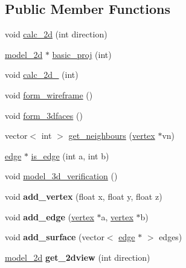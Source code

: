 \subsection*{Public Member Functions}
\begin{DoxyCompactItemize}
\item 
void \hyperlink{classmodel__3d_a34719029f1c5a2bc5a609dffc741a2e4}{calc\+\_\+2d} (int direction)
\item 
\hyperlink{classmodel__2d}{model\+\_\+2d} $\ast$ \hyperlink{classmodel__3d_aa08ac7e10a9531d7b7f8fb70b65cce82}{basic\+\_\+proj} (int)
\item 
void \hyperlink{classmodel__3d_acb0cca59029c43fe4b87b5e1b3df48f0}{calc\+\_\+2d\+\_} (int)
\item 
void \hyperlink{classmodel__3d_abc9c2cf8a0cd04a2a4cf1ce910672e76}{form\+\_\+wireframe} ()
\item 
void \hyperlink{classmodel__3d_a4e8d422205e9cbdd9048942a886700f3}{form\+\_\+3dfaces} ()
\item 
vector$<$ int $>$ \hyperlink{classmodel__3d_aabe53d192ed2dcd0157f61d24281dae2}{get\+\_\+neighbours} (\hyperlink{classvertex}{vertex} $\ast$vn)
\item 
\hyperlink{classedge}{edge} $\ast$ \hyperlink{classmodel__3d_ac834293db65510af4bd5baf0868f7bf3}{is\+\_\+edge} (int a, int b)
\item 
void \hyperlink{classmodel__3d_aadab2be6e920f20d58199e77c0e1a52b}{model\+\_\+3d\+\_\+verification} ()
\item 
void {\bfseries add\+\_\+vertex} (float x, float y, float z)\hypertarget{classmodel__3d_a8cdabecc29969b9b33d36c28af97835a}{}\label{classmodel__3d_a8cdabecc29969b9b33d36c28af97835a}

\item 
void {\bfseries add\+\_\+edge} (\hyperlink{classvertex}{vertex} $\ast$a, \hyperlink{classvertex}{vertex} $\ast$b)\hypertarget{classmodel__3d_a33e7bbfd961d698348e90469fb31d0aa}{}\label{classmodel__3d_a33e7bbfd961d698348e90469fb31d0aa}

\item 
void {\bfseries add\+\_\+surface} (vector$<$ \hyperlink{classedge}{edge} $\ast$ $>$ edges)\hypertarget{classmodel__3d_abf25bf8046997fdb9f39cfdedeea5d4b}{}\label{classmodel__3d_abf25bf8046997fdb9f39cfdedeea5d4b}

\item 
\hyperlink{classmodel__2d}{model\+\_\+2d} {\bfseries get\+\_\+2dview} (int direction)\hypertarget{classmodel__3d_a5a1b03401cf803eca587981650ec7bce}{}\label{classmodel__3d_a5a1b03401cf803eca587981650ec7bce}


\end{DoxyCompactItemize}
